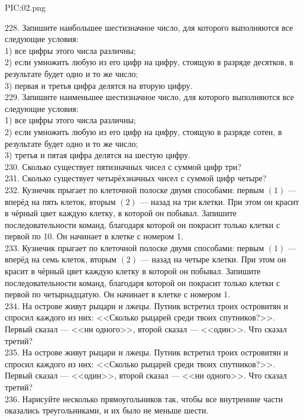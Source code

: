 \begin{center}
{{PIC:02.png}}
\end{center}
228. Запишите наибольшее шестизначное число, для которого выполняются все следующие условия:\\
1) все цифры этого числа различны;\\
2) если умножить любую из его цифр на цифру, стоящую в разряде десятков, в результате будет одно и то же число;\\
3) первая и третья цифра делятся на вторую цифру.\\
229. Запишите наименьшее шестизначное число, для которого выполняются все следующие условия:\\
1) все цифры этого числа различны;\\
2) если умножить любую из его цифр на цифру, стоящую в разряде сотен, в результате будет одно и то же число;\\
3) третья и пятая цифра делятся на шестую цифру.\\
230. Сколько существует пятизначных чисел с суммой цифр три?\\
231. Сколько существует четырёхзначных чисел с суммой цифр четыре?\\
232. Кузнечик прыгает по клеточной полоске двумя способами: первым $(1)$ --- вперёд на пять клеток, вторым $(2)$ --- назад на три клетки. При этом он красит в чёрный цвет каждую клетку,  в которой он побывал. Запишите последовательности команд, благодаря которой он покрасит только клетки с первой по 10. Он начинает в клетке с номером 1.\\
233. Кузнечик прыгает по клеточной полоске двумя способами: первым $(1)$ --- вперёд на семь клеток, вторым $(2)$ --- назад на четыре клетки. При этом он красит в чёрный цвет каждую клетку в которой он побывал. Запишите последовательности команд, благодаря которой он покрасит только клетки с первой по четырнадцатую. Он начинает в клетке с номером 1.\\
234. На острове живут рыцари и лжецы. Путник встретил троих островитян и спросил каждого из них: <<Сколько рыцарей среди твоих спутников?>>. Первый сказал --- <<ни одного>>,  второй сказал --- <<один>>. Что сказал третий?\\
235. На острове живут рыцари и лжецы. Путник встретил троих островитян и спросил каждого из них: <<Сколько рыцарей среди твоих спутников?>>. Первый сказал --- <<один>>,  второй сказал --- <<ни одного>>. Что сказал третий?\\
236. Нарисуйте несколько прямоугольников так, чтобы все внутренние части оказались треугольниками, и их было не меньше шести.\\
